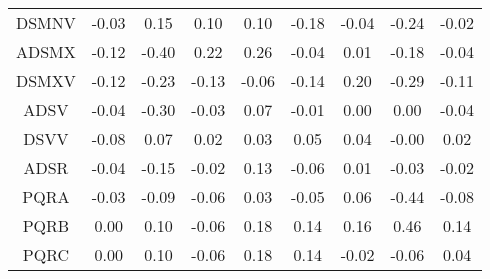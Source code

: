 \begin{longtable}{ | c || c | c | c | c | c | c | c || c |}
DSMNV &  \cellcolor[HTML]{FFFFFF} -0.03 &  \cellcolor[HTML]{FFFFFF} 0.15 &  \cellcolor[HTML]{FFFFFF} 0.10 &  \cellcolor[HTML]{FFFFFF} 0.10 &  \cellcolor[HTML]{FFF7F7} -0.18 &  \cellcolor[HTML]{FFFFFF} -0.04 &  \cellcolor[HTML]{FFF7F7} -0.24 &  \cellcolor[HTML]{FFFFFF} -0.02 \\
ADSMX &  \cellcolor[HTML]{FFFFFF} -0.12 &  \cellcolor[HTML]{FFF7F7} -0.40 &  \cellcolor[HTML]{F7F7FF} 0.22 &  \cellcolor[HTML]{F7F7FF} 0.26 &  \cellcolor[HTML]{FFFFFF} -0.04 &  \cellcolor[HTML]{FFFFFF} 0.01 &  \cellcolor[HTML]{FFF7F7} -0.18 &  \cellcolor[HTML]{FFFFFF} -0.04 \\
DSMXV &  \cellcolor[HTML]{FFFFFF} -0.12 &  \cellcolor[HTML]{FFF7F7} -0.23 &  \cellcolor[HTML]{FFFFFF} -0.13 &  \cellcolor[HTML]{FFFFFF} -0.06 &  \cellcolor[HTML]{FFFFFF} -0.14 &  \cellcolor[HTML]{F7F7FF} 0.20 &  \cellcolor[HTML]{FFF7F7} -0.29 &  \cellcolor[HTML]{FFFFFF} -0.11 \\
ADSV &  \cellcolor[HTML]{FFFFFF} -0.04 &  \cellcolor[HTML]{FFF7F7} -0.30 &  \cellcolor[HTML]{FFFFFF} -0.03 &  \cellcolor[HTML]{FFFFFF} 0.07 &  \cellcolor[HTML]{FFFFFF} -0.01 &  \cellcolor[HTML]{FFFFFF} 0.00 &  \cellcolor[HTML]{FFFFFF} 0.00 &  \cellcolor[HTML]{FFFFFF} -0.04 \\
DSVV &  \cellcolor[HTML]{FFFFFF} -0.08 &  \cellcolor[HTML]{FFFFFF} 0.07 &  \cellcolor[HTML]{FFFFFF} 0.02 &  \cellcolor[HTML]{FFFFFF} 0.03 &  \cellcolor[HTML]{FFFFFF} 0.05 &  \cellcolor[HTML]{FFFFFF} 0.04 &  \cellcolor[HTML]{FFFFFF} -0.00 &  \cellcolor[HTML]{FFFFFF} 0.02 \\
ADSR &  \cellcolor[HTML]{FFFFFF} -0.04 &  \cellcolor[HTML]{FFFFFF} -0.15 &  \cellcolor[HTML]{FFFFFF} -0.02 &  \cellcolor[HTML]{FFFFFF} 0.13 &  \cellcolor[HTML]{FFFFFF} -0.06 &  \cellcolor[HTML]{FFFFFF} 0.01 &  \cellcolor[HTML]{FFFFFF} -0.03 &  \cellcolor[HTML]{FFFFFF} -0.02 \\
PQRA &  \cellcolor[HTML]{FFFFFF} -0.03 &  \cellcolor[HTML]{FFFFFF} -0.09 &  \cellcolor[HTML]{FFFFFF} -0.06 &  \cellcolor[HTML]{FFFFFF} 0.03 &  \cellcolor[HTML]{FFFFFF} -0.05 &  \cellcolor[HTML]{FFFFFF} 0.06 &  \cellcolor[HTML]{FFF7F7} -0.44 &  \cellcolor[HTML]{FFFFFF} -0.08 \\
PQRB &  \cellcolor[HTML]{FFFFFF} 0.00 &  \cellcolor[HTML]{FFFFFF} 0.10 &  \cellcolor[HTML]{FFFFFF} -0.06 &  \cellcolor[HTML]{F7F7FF} 0.18 &  \cellcolor[HTML]{FFFFFF} 0.14 &  \cellcolor[HTML]{F7F7FF} 0.16 &  \cellcolor[HTML]{F7F7FF} 0.46 &  \cellcolor[HTML]{FFFFFF} 0.14 \\
PQRC &  \cellcolor[HTML]{FFFFFF} 0.00 &  \cellcolor[HTML]{FFFFFF} 0.10 &  \cellcolor[HTML]{FFFFFF} -0.06 &  \cellcolor[HTML]{F7F7FF} 0.18 &  \cellcolor[HTML]{FFFFFF} 0.14 &  \cellcolor[HTML]{FFFFFF} -0.02 &  \cellcolor[HTML]{FFFFFF} -0.06 &  \cellcolor[HTML]{FFFFFF} 0.04 \\

\end{longtable}

